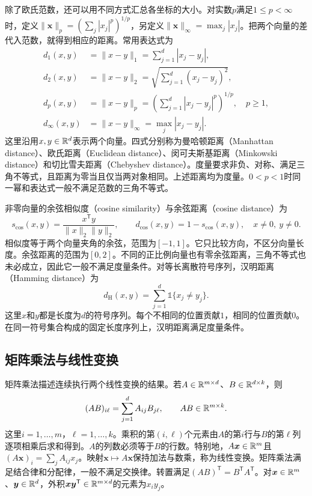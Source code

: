 除了欧氏范数，还可以用不同方式汇总各坐标的大小。对实数$p$满足$1\leq p<\infty$时，定义$\|\bm x\|_p=(\sum_j|x_j|^p)^{1/p}$，另定义$\|\bm x\|_\infty=\max_j|x_j|$。把两个向量的差代入范数，就得到相应的距离。常用表达式为
\begin{align}
 d_1(x,y)&=\|x-y\|_1=\sum_{j=1}^d|x_j-y_j|,\label{eq:math-manhattan-distance}\\
 d_2(x,y)&=\|x-y\|_2=\sqrt{\sum_{j=1}^d(x_j-y_j)^2},\label{eq:math-euclidean-distance}\\
 d_p(x,y)&=\|x-y\|_p=\left(\sum_{j=1}^d|x_j-y_j|^p\right)^{1/p},\quad p\geq1,\label{eq:math-minkowski-distance}\\
 d_\infty(x,y)&=\|x-y\|_\infty=\max_j|x_j-y_j|.\label{eq:math-chebyshev-distance}
\end{align}
这里沿用$x,y\in\mathbb{R}^d$表示两个向量。四式分别称为曼哈顿距离（Manhattan distance）、欧氏距离（Euclidean distance）、闵可夫斯基距离（Minkowski distance）和切比雪夫距离（Chebyshev distance）。度量要求非负、对称、满足三角不等式，且距离为零当且仅当两对象相同。上述距离均为度量。$0<p<1$时同一幂和表达式一般不满足范数的三角不等式。

非零向量的余弦相似度（cosine similarity）与余弦距离（cosine distance）为
\begin{equation}
 s_{\cos}(x,y)=\frac{x^{\mathsf T}y}{\|x\|_2\|y\|_2},\qquad
 d_{\cos}(x,y)=1-s_{\cos}(x,y),\quad x\ne0,\ y\ne0.
 \label{eq:math-cosine-distance}
\end{equation}
相似度等于两个向量夹角的余弦，范围为$[-1,1]$。它只比较方向，不区分向量长度。余弦距离的范围为$[0,2]$。不同的正比例向量也有零余弦距离，三角不等式也未必成立，因此它一般不满足度量条件。对等长离散符号序列，汉明距离（Hamming distance）为
\begin{equation}
 d_{\mathrm H}(x,y)=\sum_{j=1}^d\mathbb{1}\{x_j\ne y_j\}.
 \label{eq:math-hamming-distance}
\end{equation}
这里$x$和$y$都是长度为$d$的符号序列。每个不相同的位置贡献$1$，相同的位置贡献$0$。在同一符号集合构成的固定长度序列上，汉明距离满足度量条件。

\subsection{矩阵乘法与线性变换}
矩阵乘法描述连续执行两个线性变换的结果。若$A\in\mathbb{R}^{m\times d}$、$B\in\mathbb{R}^{d\times k}$，则
\begin{equation}
 (AB)_{i\ell}=\sum_{j=1}^d A_{ij}B_{j\ell},\qquad AB\in\mathbb{R}^{m\times k}.
\end{equation}
这里$i=1,\ldots,m$，$\ell=1,\ldots,k$。乘积的第$(i,\ell)$个元素由$A$的第$i$行与$B$的第$\ell$列逐项相乘后求和得到。$A$的列数必须等于$B$的行数。特别地，$A\bm x\in\mathbb{R}^m$且$(A\bm x)_i=\sum_jA_{ij}x_j$。映射$\bm x\mapsto A\bm x$保持加法与数乘，称为线性变换。矩阵乘法满足结合律和分配律，一般不满足交换律。转置满足$(AB)^{\mathsf T}=B^{\mathsf T}A^{\mathsf T}$。对$\bm x\in\mathbb{R}^m$、$\bm y\in\mathbb{R}^d$，外积$\bm x\bm y^{\mathsf T}\in\mathbb{R}^{m\times d}$的元素为$x_iy_j$。


